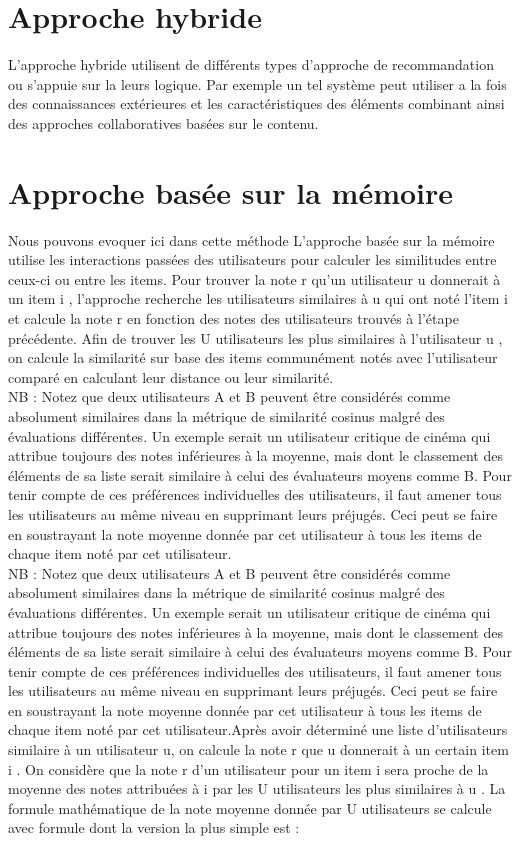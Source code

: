 \documentclass[12pt,a4paper]{article}
\begin{document}
\section{Approche hybride}
L'approche hybride utilisent de différents types d'approche de recommandation ou s'appuie sur la leurs logique. Par exemple un tel système peut utiliser a la fois des connaissances extérieures et les caractéristiques des éléments combinant ainsi des approches collaboratives basées sur le contenu.


\section{Approche basée sur la mémoire}
 Nous pouvons evoquer ici \cite{Bastin2021} dans cette méthode L'approche basée sur la mémoire utilise les interactions passées des utilisateurs pour
calculer les similitudes entre ceux-ci ou entre les items. Pour trouver la note r qu'un
utilisateur u donnerait à un item i , l'approche recherche les utilisateurs similaires à u
qui ont noté l’item i et calcule la note r en fonction des notes des utilisateurs trouvés à
l'étape précédente. Afin de trouver les U utilisateurs les plus similaires à l'utilisateur u ,
on calcule la similarité sur base des items communément notés avec l'utilisateur comparé
en calculant leur distance ou leur similarité.\\ 
NB : Notez que deux utilisateurs A et B peuvent être considérés comme
absolument similaires dans la métrique de similarité cosinus malgré des
évaluations différentes. Un exemple serait un utilisateur critique de cinéma qui attribue toujours des notes inférieures à la moyenne, mais dont le classement des éléments de sa liste serait similaire à celui des évaluateurs moyens comme B. Pour tenir compte de ces préférences individuelles des utilisateurs, il faut amener tous les utilisateurs au même niveau en supprimant leurs préjugés. Ceci peut se faire en
soustrayant la note moyenne donnée par cet utilisateur à tous les items de chaque item noté par cet utilisateur.\\
NB : Notez que deux utilisateurs A et B peuvent être considérés comme
absolument similaires dans la métrique de similarité cosinus malgré des
évaluations différentes. Un exemple serait un utilisateur critique de cinéma qui attribue toujours des notes inférieures à la moyenne, mais dont le classement des éléments de sa liste serait similaire à celui des évaluateurs moyens comme B. Pour tenir compte de ces préférences individuelles des utilisateurs, il faut amener tous les utilisateurs au même niveau en supprimant leurs préjugés. Ceci peut se faire en soustrayant la note moyenne donnée par cet utilisateur à tous les items de chaque item noté par cet utilisateur.Après avoir déterminé une liste d'utilisateurs similaire à un utilisateur u, on calcule la note r que u donnerait à un certain item i .
On considère que la note r d'un utilisateur pour un item i sera proche de la moyenne des
notes attribuées à i par les U utilisateurs les plus similaires à u . La formule mathématique de la note moyenne donnée par U utilisateurs se calcule avec formule dont la version la plus simple est :
\end{document}
